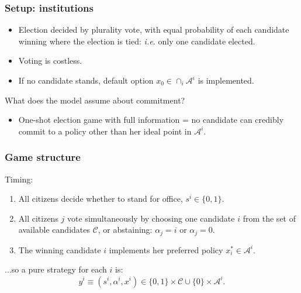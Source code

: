 \documentclass[11pt,aspectratio=169]{beamer}
\begin{document}
\begin{frame}
\frametitle{Setup: institutions}

\begin{itemize}
\item Election decided by plurality vote, with equal probability of each candidate winning where the election is tied: {\it i.e.} only one candidate elected.
\item Voting is costless. 
\item If no candidate stands, default option $x_0 \in \cap_i \mathcal{A}^i$ is implemented.
\end{itemize}

\pause
\begin{tcolorbox}
What does the model assume about commitment?
\end{tcolorbox}

\pause 

\begin{itemize}
\item One-shot election game with full information = no candidate can credibly commit to a policy other than her ideal point in $\mathcal{A}^i$. %
\end{itemize}

\end{frame}



\begin{frame}
\frametitle{Game structure}

Timing: \begin{enumerate}
\item All citizens decide whether to stand for office, $s^i\in\{0,1\}$.
\item All citizens $j$ vote simultaneously by choosing one candidate $i$ from the set of available candidates $\mathcal{C}$, or abstaining: $\alpha_j = i$ or $\alpha_j=0$. 
\item The winning candidate $i$ implements her preferred policy $x^*_i \in  \mathcal{A}^i$.
\end{enumerate}

...so a pure strategy for each $i$ is: $$y^i \equiv (s^i,\alpha^i,x^i) \in \{0,1\} \times \mathcal{C} \cup \{0\} \times \mathcal{A}^i.$$

\end{frame}
\end{document}
